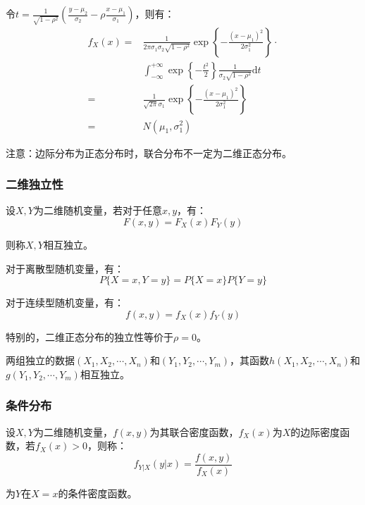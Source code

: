 \documentclass[a4paper,12pt]{ctexart}
\begin{document}
令$t = \frac{1}{\sqrt{1-\rho^2}}\left(\frac{y-\mu_2}{\sigma_2} - \rho \frac{x-\mu_1}{\sigma_1}\right)$，则有：
\begin{align*}
	f_X(x) =& \frac{1}{2\pi\sigma_1\sigma_2\sqrt{1-\rho^2}} \exp\left\{-\frac{(x-\mu_1)^2}{2\sigma_1^2}\right\} \cdot \\
	 & \int_{-\infty}^{+\infty}\exp\left\{-\frac{t^2}{2}\right\} \frac{1}{\sigma_2 \sqrt{1 - \rho^2}}\mathrm{d}t \\
	=& \frac{1}{\sqrt{2\pi}\sigma_1} \exp\left\{-\frac{(x-\mu_1)^2}{2\sigma_1^2}\right\} \\
	=& N(\mu_1,\sigma_1^2)
\end{align*}

注意：边际分布为正态分布时，联合分布不一定为二维正态分布。

\subsubsection{二维独立性}

设$X,Y$为二维随机变量，若对于任意$x,y$，有：
\begin{equation*}
	F(x,y) = F_X(x)F_Y(y)
\end{equation*}

则称$X,Y$相互独立。

对于离散型随机变量，有：
\begin{equation*}
	P\{X = x,Y = y\} = P\{X = x\}P\{Y = y\}
\end{equation*}

对于连续型随机变量，有：
\begin{equation*}
	f(x,y) = f_X(x)f_Y(y)
\end{equation*}

特别的，二维正态分布的独立性等价于$\rho = 0$。

两组独立的数据$(X_1, X_2, \cdots, X_n)$和$(Y_1, Y_2, \cdots, Y_m)$，其函数$h(X_1, X_2, \cdots, X_n)$和$g(Y_1, Y_2, \cdots, Y_m)$相互独立。

\subsubsection{条件分布}

设$X,Y$为二维随机变量，$f(x,y)$为其联合密度函数，$f_X(x)$为$X$的边际密度函数，若$f_X(x) > 0$，则称：
\begin{equation*}
	f_{Y|X}(y|x) = \frac{f(x,y)}{f_X(x)}
\end{equation*}

为$Y$在$X = x$的条件密度函数。
\end{document}
